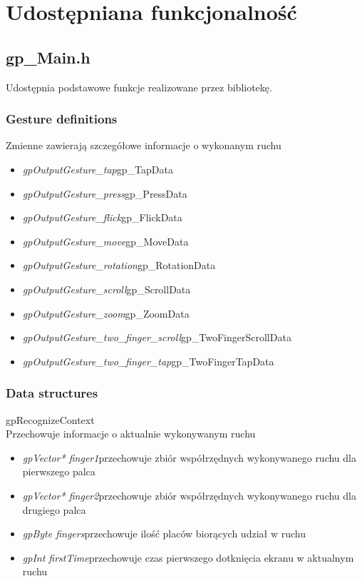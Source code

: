 \section{Udostępniana funkcjonalność}
\subsection{gp_Main.h}
Udostępnia podstawowe funkcje realizowane przez bibliotekę.
\subsubsection{Gesture definitions} Zmienne zawierają szczegółowe informacje o wykonanym ruchu

\begin{itemize}
\item \textit{gpOutputGesture_tap}\quad gp_TapData
\item \textit{gpOutputGesture_press}\quad gp_PressData
\item \textit{gpOutputGesture_flick}\quad gp_FlickData
\item \textit{gpOutputGesture_move}\quad gp_MoveData
\item \textit{gpOutputGesture_rotation}\quad gp_RotationData
\item \textit{gpOutputGesture_scroll}\quad gp_ScrollData
\item \textit{gpOutputGesture_zoom}\quad gp_ZoomData
\item \textit{gpOutputGesture_two_finger_scroll}\quad gp_TwoFingerScrollData
\item \textit{gpOutputGesture_two_finger_tap}\quad gp_TwoFingerTapData
\end{itemize}
\subsubsection{Data structures}
\textsf{gpRecognizeContext} \\ \indent Przechowuje informacje o aktualnie wykonywanym ruchu
	\begin{itemize}
		\item \textit{gpVector* finger1}\quad przechowuje zbiór współrzędnych wykonywanego ruchu dla pierwszego palca
		\item \textit{gpVector* finger2}\quad przechowuje zbiór współrzędnych wykonywanego ruchu dla drugiego palca
		\item \textit{gpByte fingers}\quad przechowuje ilość placów biorących udział w ruchu
		\item \textit{gpInt firstTime}\quad przechowuje czas pierwszego dotknięcia ekranu w aktualnym ruchu
	\end{itemize}
\ \\
